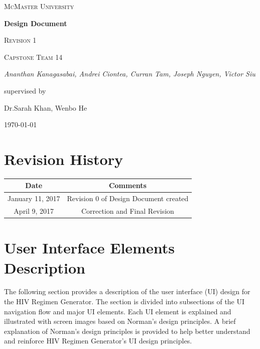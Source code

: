 \documentclass[12pt]{article}
\begin{document}
\begin{titlepage}
	\centering
	{\scshape\LARGE McMaster University \par}
	\vspace{1.5cm}
	{\huge\bfseries Design Document \par}
    {\scshape\Large Revision 1 \par}

	\vspace{1cm}
	{\scshape\Large Capstone Team 14\par}
	{\Large\itshape Ananthan Kanagasabai, Andrei Ciontea, Curran Tam, Joseph Nguyen, Victor Siu \par}
	\vspace{3cm}
	\vfill
	supervised by\par
	Dr.Sarah Khan, Wenbo He

	\vfill
	{\large \today\par}
\end{titlepage}

\newpage

\tableofcontents
\listoffigures

\section*{Revision History}
\begin{tabular}{|c|c|}
\hline
\textbf{Date}  & \textbf{Comments} \\ \hline
January 11, 2017 & Revision 0 of Design Document created \\ 
\hline
April 9, 2017 & Correction and Final Revision\\
\hline
\end{tabular}

\newpage


\section{User Interface Elements Description}
The following section provides a description of the user interface (UI) design for the HIV Regimen Generator. The section is divided into subsections of the UI navigation flow and major UI elements. Each UI element is explained and illustrated with screen images based on Norman’s design principles. A brief explanation of Norman’s design principles is provided to help better understand and reinforce HIV Regimen Generator’s UI design principles.
\end{document}

